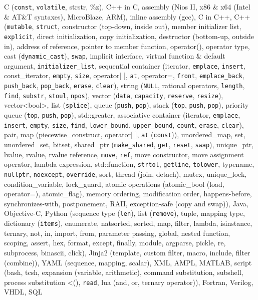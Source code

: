 \documentclass[letterpaper,11pt]{article}
\begin{document}
\begin{description}
\setlength{\itemindent}{-0.1in}

\item[Programming Languages:] C ({\tt const}, {\tt volatile}, strstr, \%z), C++ in C, assembly (Nios II, x86 \& x64 (Intel \& AT\&T syntaxes), MicroBlaze, ARM),
inline assembly (gcc), C in C++,
%
C++ ({\tt mutable}, {\tt struct}, constructor (top-down, inside out), member initializer list, {\tt explicit}, direct initialization, copy initialization,
destructor (bottom-up, outside in), address of reference, pointer to member function, operator(), operator type,
cast ({\tt dynamic\_cast}), {\tt swap},
implicit interface, virtual function \& default argument, {\tt initializer\_list},
%
sequential container (iterator, {\tt emplace}, {\tt insert}, const\_iterator,
{\tt empty}, {\tt size}, operator[ ], {\tt at}, operator=, {\tt front}, {\tt emplace\_back},
{\tt push\_back}, {\tt pop\_back}, {\tt erase}, {\tt clear}),
%
string ({\tt NULL}, rational operators, {\tt length}, {\tt find}, {\tt substr}, {\tt stoul}, {\tt npos}),
vector ({\tt data}, {\tt capacity}, {\tt reserve}, {\tt resize}), vector\textless bool\textgreater,
list ({\tt splice}),
queue ({\tt push}, {\tt pop}), stack ({\tt top}, {\tt push}, {\tt pop}),
priority queue ({\tt top}, {\tt push}, {\tt pop}), std::greater,
%
associative container (iterator, {\tt emplace}, {\tt insert}, {\tt empty}, {\tt size},
{\tt find}, {\tt lower\_bound}, {\tt upper\_bound},
{\tt count}, {\tt erase}, {\tt clear}),
%
pair, map (piecewise\_construct, operator[ ], {\tt at} ({\tt const})), unordered\_map, set, unordered\_set,
%
bitset,
%
shared\_ptr ({\tt make\_shared}, {\tt get}, {\tt reset}, {\tt swap}), unique\_ptr,
lvalue, rvalue, rvalue reference, {\tt move}, {\tt ref}, move constructor, move assignment operator,
%
lambda expression, std::function, {\tt strtol}, {\tt getline}, {\tt tolower},
typename, {\tt nullptr}, {\tt noexcept}, {\tt override},
sort,
%
thread (join, detach),
mutex, unique\_lock, condition\_variable, lock\_guard,
atomic operations (atomic\_bool (load, operator=), atomic\_flag), memory ordering, modification order, happens-before, synchronizes-with,
%
postponement, RAII, exception-safe (copy and swap)),
%
Java, Objective-C,
%
Python (sequence type ({\tt len}), list ({\tt remove}), tuple, mapping type, dictionary ({\tt items}),
enumerate, natsorted, sorted, map, filter, lambda, isinstance, ternary, not, in, import, from, parameter passing,
global, nested function, scoping, assert, hex, format,
except, finally, module, argparse, pickle, re, subprocess, binascii, click),
%
Jinja2 (template, custom filter, macro, include, filter (combine)), YAML (sequence, mapping, scalar),
XML, AMPL, MATLAB,
%
script (bash, tcsh, expansion (variable, arithmetic), command substitution, subshell, process substitution \textless(), {\tt read},
lua (and, or, ternary operator)),
Fortran, Verilog, VHDL, SQL %


\end{description}
\end{document}
